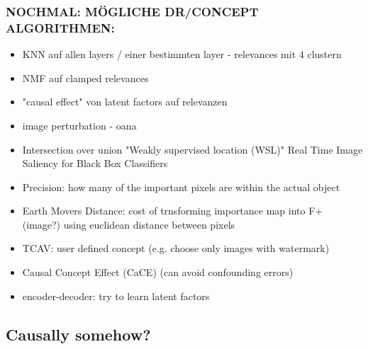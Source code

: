 \subsubsection*{NOCHMAL: MÖGLICHE DR/CONCEPT ALGORITHMEN:}
\begin{itemize}
    \item KNN auf allen layers / einer bestimmten layer - relevances mit 4 clustern
    \item NMF auf clamped relevances
    \item "causal effect" von latent factors auf relevanzen
    \item image perturbation - oana
    \item Intersection over union "Weakly supervised location (WSL)" Real Time Image Saliency for Black Box Classifiers
    \item Precision: how many of the important pixels are within the actual object
    \item Earth Movers Distance: cost of trnsforming importance map into F+ (image?) using euclidean distance between pixels
    \item TCAV: user defined concept (e.g. choose only images with watermark) 
    \item Causal Concept Effect (CaCE) (can avoid confounding errors) 
    \item encoder-decoder: try to learn latent factors 
\end{itemize}


\subsection{Causally somehow? }